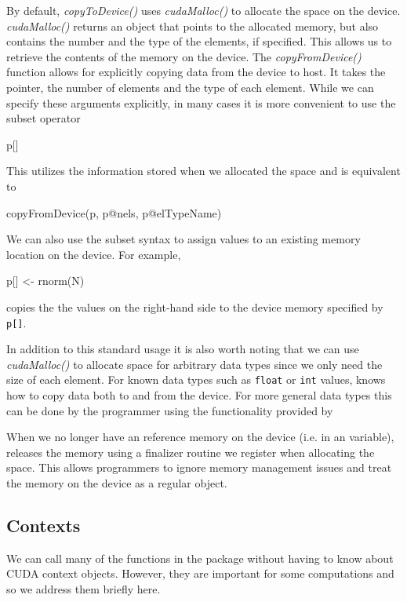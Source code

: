 \documentclass[article]{jss}
\def\R{\proglang{R}}
\def\Rpkg#1{\pkg{#1}}
\def\Rfunc#1{\textsl{#1()}}
\def\Ctype#1{\texttt{#1}}
\begin{document}
By default, \Rfunc{copyToDevice} uses \Rfunc{cudaMalloc} to allocate
the space on the device.  \Rfunc{cudaMalloc} returns an object that
points to the allocated memory, but also contains the number and the
type of the elements, if specified.  This allows us to retrieve the
contents of the memory on the device.  The \Rfunc{copyFromDevice}
function allows for explicitly copying data from the device to host.
It takes the pointer, the number of elements and
the type of each element. While we can specify these arguments explicitly,
in many cases it is more convenient to use the subset operator
\begin{RCode}
p[]
\end{RCode}
This utilizes the information stored when we allocated the space and
is equivalent to 
\begin{RCode}
copyFromDevice(p, p@nels, p@elTypeName)
\end{RCode}

We can also use the subset syntax to assign values to an existing
memory location on the device. For example, 
\begin{RCode}
p[] <- rnorm(N)
\end{RCode}
copies the the values on the right-hand side to the device memory 
specified by \texttt{p[]}.

In addition to this standard usage it is also worth noting that we can
use \Rfunc{cudaMalloc} to allocate space for arbitrary data
types since we only need the size of each element. For known data types
such as \Ctype{float} or \Ctype{int} values, \Rpkg{RCUDA} knows how to
copy data both to and from the device. For more general data types
this can be done by the \R{} programmer using the functionality 
provided by \Rpkg{RCUDA} 

When we no longer have an \R{} reference memory on the device (i.e. in
an \R{} variable), \R{} releases the memory using a finalizer routine
we register when allocating the space.  This allows \R{} programmers
to ignore memory management issues and treat the memory on the device
as a regular \R{} object.



\subsection{Contexts}\label{subsec:Contexts}
We can call many of the functions in the \Rpkg{RCUDA}  package
without having to know about CUDA context objects.
However, they are important for some computations and so we 
address them briefly here.
\end{document}
